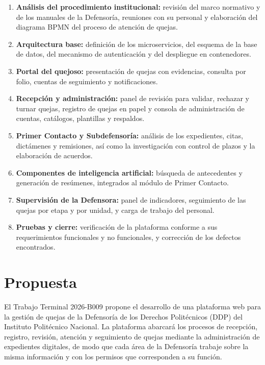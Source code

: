 \begin{enumerate}
    \item \textbf{Análisis del procedimiento institucional:} revisión del marco normativo y de los manuales de la Defensoría, reuniones con su personal y elaboración del diagrama BPMN del proceso de atención de quejas.
    \item \textbf{Arquitectura base:} definición de los microservicios, del esquema de la base de datos, del mecanismo de autenticación y del despliegue en contenedores.
    \item \textbf{Portal del quejoso:} presentación de quejas con evidencias, consulta por folio, cuentas de seguimiento y notificaciones.
    \item \textbf{Recepción y administración:} panel de revisión para validar, rechazar y turnar quejas, registro de quejas en papel y consola de administración de cuentas, catálogos, plantillas y respaldos.
    \item \textbf{Primer Contacto y Subdefensoría:} análisis de los expedientes, citas, dictámenes y remisiones, así como la investigación con control de plazos y la elaboración de acuerdos.
    \item \textbf{Componentes de inteligencia artificial:} búsqueda de antecedentes y generación de resúmenes, integrados al módulo de Primer Contacto.
    \item \textbf{Supervisión de la Defensora:} panel de indicadores, seguimiento de las quejas por etapa y por unidad, y carga de trabajo del personal.
    \item \textbf{Pruebas y cierre:} verificación de la plataforma conforme a sus requerimientos funcionales y no funcionales, y corrección de los defectos encontrados.
\end{enumerate}

\section{Propuesta}
\label{sec:propuesta_proyecto}

El Trabajo Terminal 2026-B009 propone el desarrollo de una plataforma web para la gestión de quejas de la Defensoría de los Derechos Politécnicos (DDP) del Instituto Politécnico Nacional. La plataforma abarcará los procesos de recepción, registro, revisión, atención y seguimiento de quejas mediante la administración de expedientes digitales, de modo que cada área de la Defensoría trabaje sobre la misma información y con los permisos que corresponden a su función.

